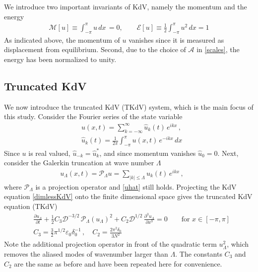 \documentclass[11pt]{article}
\newcommand{\pd}[2]    { \frac{\partial #1} {\partial #2} }
\newcommand{\abs}[1]{\left| #1 \right|}
\newcommand{\eps}{\varepsilon}
\newcommand{\dx}{\, dx}
\newcommand{\lamfac}{N}
\newcommand{\drat}{\mathcal{D}}
\newcommand{\En}{\mathcal{E}}
\newcommand{\Mo}{\mathcal{M}}
\newcommand{\ampscale}{\mathcal{A}}
\newcommand{\epsup}{\eps_0}
\newcommand{\delup}{\delta_0}
\newcommand{\uhat}{\hat{u}}
\newcommand{\sympJ}{\mathcal{J}}
\newcommand{\vard}[2]{\frac{\delta #1}{\delta #2}}
\newcommand{\Ham}{\mathcal{H}}
\newcommand{\Hup}{\Ham^{-}}
\newcommand{\Hdn}{\Ham^{+}}
\newcommand{\Proj}{\mathcal{P}_{\Lambda}}
\newcommand{\uL}{u_{\Lambda}}
\begin{document}
We introduce two important invariants of KdV, namely the momentum and the energy
\begin{align}
\label{MomEn}
\Mo[u] \equiv \int_{-\pi}^{\pi} u \dx \, = 0 , \qquad
\En[u] \equiv \frac{1}{2} \int_{-\pi}^{\pi} u^2 \dx = 1
\end{align}
As indicated above, the momentum of $u$ vanishes since it is measured as displacement from equilibrium. Second, due to the choice of $\ampscale$ in \eqref{scales}, the energy has been normalized to unity.

\subsection{Truncated KdV}
\label{tKdVSec}

We now introduce the truncated KdV (TKdV) system, which is the main focus of this study. Consider the Fourier series of the state variable
\begin{align}
&u(x,t) = \sum_{k=-\infty}^{\infty} \uhat_k(t) \, e^{i k x} \, , \\
\label{uhat}
&\uhat_k(t) = \frac{1}{2 \pi} \int_{-\pi}^{\pi} u(x,t) \, e^{-i k x} \dx
\end{align}
Since $u$ is real valued, $\uhat_{-k} = \uhat_{k}^*$, and since momentum vanishes $\uhat_0 = 0$.
Next, consider the Galerkin truncation at wave number $\Lambda$
\begin{align}
\uL(x,t) = \Proj u =
\sum_{\abs{k} \le \Lambda} \uhat_k(t) \, e^{i k x} \, , \qquad
\end{align}
where $\Proj$ is a projection operator and \eqref{uhat} still holds. Projecting the KdV equation \eqref{dimlessKdV} onto the finite dimensional space gives the truncated KdV equation (TKdV)
\begin{align}
\label{TKdV}
&\pd{\uL}{t} +  \frac{1}{2} C_3 \drat^{-3/2} \,\Proj (\uL)^2 + C_2 \drat^{1/2} \, \frac{\partial^3 \uL}{\partial x^3} = 0
\qquad \text{for } x \in [-\pi,\pi] \\
&C_3 = \frac{3}{2} \pi^{1/2} \epsup \delup^{-1} \, , \quad
C_2 = \frac{2 \pi^2 \delup}{3 \lamfac^2}
\end{align}
Note the additional projection operator in front of the quadratic term $\uL^2$, which removes the aliased modes of wavenumber larger than $\Lambda$. The constants $C_3$ and $C_2$ are the same as before and have been repeated here for convenience. 
\end{document}
